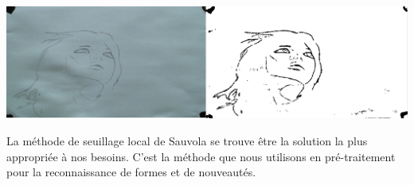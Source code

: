 %
%
%
%     
%

\begin{center}

\includegraphics[width=\textwidth]{images/Sauvola.png}
\end{center}

La méthode de seuillage local de Sauvola se trouve être la solution la plus appropriée à nos besoins.
C'est la méthode que nous utilisons en pré-traitement pour la reconnaissance de formes et de nouveautés.   

